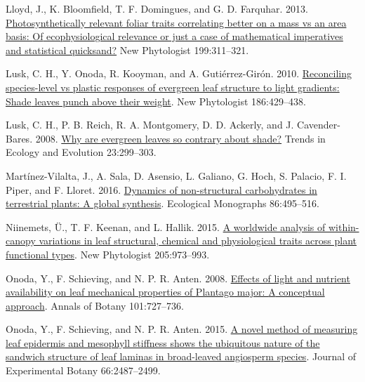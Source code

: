 \documentclass[
  12pt,
]{article}
\begin{document}
\begin{CSLReferences}{1}{0}
\leavevmode{}%
Lloyd, J., K. Bloomfield, T. F. Domingues, and G. D. Farquhar. 2013. \href{https://doi.org/10.1111/nph.12281}{Photosynthetically relevant foliar traits correlating better on a mass vs an area basis: {Of} ecophysiological relevance or just a case of mathematical imperatives and statistical quicksand?} New Phytologist 199:311--321.

\leavevmode{}%
Lusk, C. H., Y. Onoda, R. Kooyman, and A. Gutiérrez-Girón. 2010. \href{https://doi.org/10.1111/j.1469-8137.2010.03202.x}{Reconciling species-level vs plastic responses of evergreen leaf structure to light gradients: {Shade} leaves punch above their weight}. New Phytologist 186:429--438.

\leavevmode{}%
Lusk, C. H., P. B. Reich, R. A. Montgomery, D. D. Ackerly, and J. Cavender-Bares. 2008. \href{https://doi.org/10.1016/j.tree.2008.02.006}{Why are evergreen leaves so contrary about shade?} Trends in Ecology and Evolution 23:299--303.

\leavevmode{}%
Martínez-Vilalta, J., A. Sala, D. Asensio, L. Galiano, G. Hoch, S. Palacio, F. I. Piper, and F. Lloret. 2016. \href{https://doi.org/10.1002/ecm.1231}{Dynamics of non-structural carbohydrates in terrestrial plants: A global synthesis}. Ecological Monographs 86:495--516.

\leavevmode{}%
Niinemets, Ü., T. F. Keenan, and L. Hallik. 2015. \href{https://doi.org/10.1111/nph.13096}{A worldwide analysis of within-canopy variations in leaf structural, chemical and physiological traits across plant functional types}. New Phytologist 205:973--993.

\leavevmode{}%
Onoda, Y., F. Schieving, and N. P. R. Anten. 2008. \href{https://doi.org/10.1093/aob/mcn013}{Effects of light and nutrient availability on leaf mechanical properties of {Plantago} major: {A} conceptual approach}. Annals of Botany 101:727--736.

\leavevmode{}%
Onoda, Y., F. Schieving, and N. P. R. Anten. 2015. \href{https://doi.org/10.1093/jxb/erv024}{A novel method of measuring leaf epidermis and mesophyll stiffness shows the ubiquitous nature of the sandwich structure of leaf laminas in broad-leaved angiosperm species}. Journal of Experimental Botany 66:2487--2499.


\end{CSLReferences}
\end{document}
